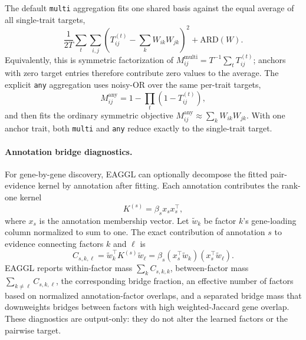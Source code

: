 \documentclass[11pt]{article}
\begin{document}
The default \texttt{multi} aggregation fits one shared basis against the equal
average of all single-trait targets,
\begin{equation}
\frac{1}{2T}\sum_t \sum_{i,j}
\left(T_{ij}^{(t)} - \sum_k W_{ik}W_{jk}\right)^2
+ \mathrm{ARD}(W).
\label{eq:eaggl_gene_gene_multi_anchor}
\end{equation}
Equivalently, this is symmetric factorization of
$M_{ij}^{\mathrm{multi}} = T^{-1}\sum_t T_{ij}^{(t)}$; anchors with zero target
entries therefore contribute zero values to the average.
The explicit \texttt{any} aggregation uses noisy-OR over the same per-trait targets,
\begin{equation}
M_{ij}^{\mathrm{any}} = 1 - \prod_t \left(1 - T_{ij}^{(t)}\right),
\label{eq:eaggl_gene_gene_any_anchor}
\end{equation}
and then fits the ordinary symmetric objective
$M_{ij}^{\mathrm{any}} \approx \sum_k W_{ik}W_{jk}$. With one anchor trait, both
\texttt{multi} and \texttt{any} reduce exactly to the single-trait target.

\paragraph{Annotation bridge diagnostics.}
For gene-by-gene discovery, EAGGL can optionally decompose the fitted pair-evidence
kernel by annotation after fitting. Each annotation contributes the rank-one kernel
\begin{equation}
K^{(s)} = \beta_s x_s x_s^\top,
\end{equation}
where $x_s$ is the annotation membership vector. Let $\widetilde w_k$ be factor
$k$'s gene-loading column normalized to sum to one. The exact contribution of
annotation $s$ to evidence connecting factors $k$ and $\ell$ is
\begin{equation}
C_{s,k,\ell}
= \widetilde w_k^\top K^{(s)} \widetilde w_\ell
= \beta_s (x_s^\top \widetilde w_k)(x_s^\top \widetilde w_\ell).
\end{equation}
EAGGL reports within-factor mass $\sum_k C_{s,k,k}$, between-factor mass
$\sum_{k\ne\ell} C_{s,k,\ell}$, the corresponding bridge fraction, an effective
number of factors based on normalized annotation-factor overlaps, and a separated
bridge mass that downweights bridges between factors with high weighted-Jaccard gene
overlap. These diagnostics are output-only: they do not alter the learned factors or
the pairwise target.
\end{document}

